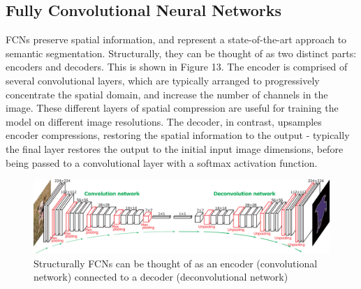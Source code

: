 \documentclass[a4paper]{article}
\begin{document}
\subsection{Fully Convolutional Neural Networks}
FCNs preserve spatial information, and represent a state-of-the-art approach to semantic segmentation. Structurally, they can be thought of as two distinct parts: encoders and decoders. This is shown in Figure 13. The encoder is comprised of several convolutional layers, which are typically arranged to progressively concentrate the spatial domain, and increase the number of channels in the image. These different layers of spatial compression are useful for training the model on different image resolutions. The decoder, in contrast, upsamples encoder compressions, restoring the spatial information to the output - typically the final layer restores the output to the initial input image dimensions, before being passed to a convolutional layer with a softmax activation function.
\vspace{0.25cm}
\begin{figure}[h]
\centering
\includegraphics[scale=0.25]{FCN}
\caption{Structurally FCNs can be thought of as an encoder (convolutional network) connected to a decoder (deconvolutional network)}
\end{figure}
\end{document}
